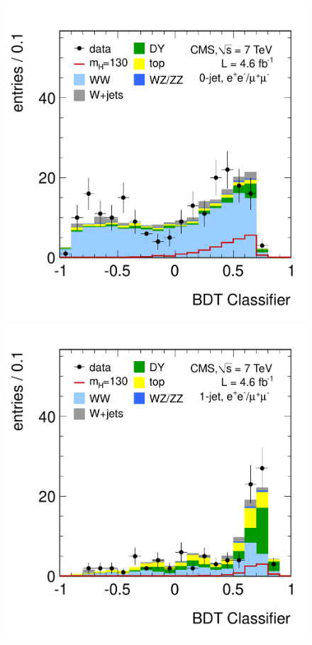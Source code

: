 \documentclass[11pt,twoside,a4paper,cmspaper,final,collab]{cms-tdr}
\begin{document}
\begin{figure}[htbp]
\begin{center}
   \includegraphics[width=\cmsFigWidth]{histo_mva_130_0j_sf}
   \includegraphics[width=\cmsFigWidth]{histo_mva_130_1j_sf}

\end{center}
\end{figure}
\end{document}
